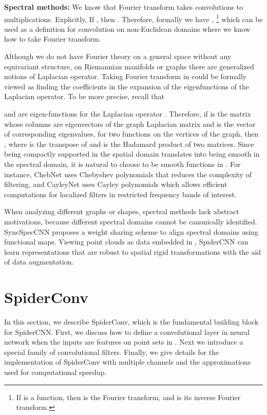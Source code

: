 \documentclass[runningheads]{llncs}
\begin{document}
{\noindent \bf Spectral methods:}
We know that Fourier transform takes convolutions to multiplications. Explicitly, If , then . Therefore, formally we have ,
\footnote{If  is a function, then  is the Fourier transform, and  is its inverse Fourier transform.}
which can be used as a definition for convolution on non-Euclidean domains where we know how to take Fourier transform. 

Although we do not have Fourier theory on a general space without any equivariant structure, on Riemannian manifolds or graphs there are generalized notions of Laplacian operator. Taking Fourier transform in  could be formally viewed as finding the coefficients in the expansion of the eigenfunctions of the Laplacian operator. To be more precise, recall that 

and   are eigen-functions for the Laplacian operator 
.
Therefore, if  is the matrix whose columns are eigenvectors of the graph Laplacian matrix and  is the vector of corresponding eigenvalues, for  two functions on the vertices of the graph, then , where  is the transpose of  and  is the Hadamard product of two matrices.
Since being compactly supported in the spatial domain translates into being smooth in the spectral domain, it is natural to choose  to be smooth functions in . For instance, ChebNet \cite{defferrard2016convolutional} uses Chebyshev polynomials that reduces the complexity of filtering, and CayleyNet \cite{levie2017cayleynets} uses Cayley polynomials which allows efficient computations for localized filters in restricted frequency bands of interest. 

When analyzing different graphs or shapes, spectral methods lack abstract motivations, because different spectral domains cannot be canonically identified. SyncSpecCNN \cite{yi2017syncspeccnn} proposes a weight sharing scheme to align spectral domains using functional maps. Viewing point clouds as data embedded in , SpiderCNN can learn representations that are robust to spatial rigid transformations with the aid of data augmentation.


\section{SpiderConv}

In this section, we describe SpiderConv, which is the fundamental building block for SpiderCNN. First, we discuss how to define a convolutional layer in neural network when the inputs are features on point sets in . Next we introduce a special family of convolutional filters. Finally, we give details for the implementation of SpiderConv with multiple channels and the approximations used for computational speedup. 
\end{document}
